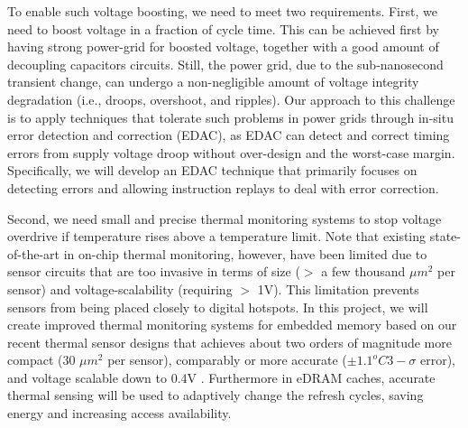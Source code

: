 To enable such voltage boosting, we need to meet two requirements.  First, we need to boost voltage in a fraction of cycle time. 
This can be achieved first by having strong power-grid for boosted voltage, together with a good amount of decoupling capacitors circuits. 
Still, the power grid, due to the sub-nanosecond transient change, can undergo a non-negligible amount of voltage integrity degradation (i.e., droops, overshoot, and ripples). 
Our approach to this challenge is to apply techniques that tolerate such problems in power grids through in-situ error detection and correction (EDAC), as EDAC can detect and correct timing errors from supply voltage droop without over-design and the worst-case margin. Specifically, we will develop an EDAC technique that primarily focuses on detecting errors and allowing instruction replays to deal with error correction.

Second, we need small and precise thermal monitoring systems to stop voltage overdrive if temperature rises above a temperature limit. 
Note that existing state-of-the-art in on-chip thermal monitoring, however, have been limited due to sensor circuits that are too invasive in terms of size ($>$ a few thousand $\mu m^2$ per sensor) and voltage-scalability (requiring $>$ 1V). 
This limitation prevents sensors from being placed closely to digital hotspots. 
In this project, we will create improved thermal monitoring systems for embedded memory based on our recent thermal sensor designs that achieves about two orders of magnitude more compact (30 $\mu m^2$ per sensor), comparably or more accurate ($\pm 1.1^oC 3-\sigma$ error), and voltage scalable down to 0.4V \cite{ISSCC14, JSSC15, CICC15}. 
Furthermore in eDRAM caches, accurate thermal sensing will be used to adaptively change the refresh cycles, saving energy and increasing access availability. 

